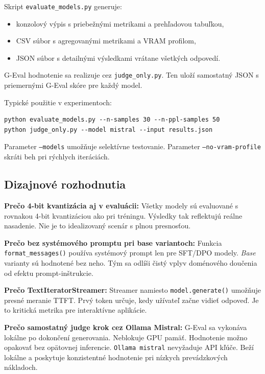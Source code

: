 Skript \texttt{evaluate\_models.py} generuje:
\begin{itemize}
    \item konzolový výpis s priebežnými metrikami a prehľadovou tabuľkou,
    \item CSV súbor s agregovanými metrikami a VRAM profilom,
    \item JSON súbor s detailnými výsledkami vrátane všetkých odpovedí.
\end{itemize}
 
G-Eval hodnotenie sa realizuje cez \texttt{judge\_only.py}. Ten uloží samostatný JSON s priemernými G-Eval skóre pre každý model.
 
Typické použitie v experimentoch:
\begin{verbatim}
python evaluate_models.py --n-samples 30 --n-ppl-samples 50
python judge_only.py --model mistral --input results.json
\end{verbatim}
 
Parameter \texttt{--models} umožňuje selektívne testovanie. Parameter \texttt{--no-vram-profile} skráti beh pri rýchlych iteráciách.
 
\subsection{Dizajnové rozhodnutia}
 
\textbf{Prečo 4-bit kvantizácia aj v evaluácii:}
Všetky modely sú evaluované s rovnakou 4-bit kvantizáciou ako pri tréningu. Výsledky tak reflektujú reálne nasadenie. Nie je to idealizovaný scenár s plnou presnosťou.
 
\textbf{Prečo bez systémového promptu pri base variantoch:}
Funkcia \texttt{format\_messages()} používa systémový prompt len pre SFT/DPO modely. \emph{Base} varianty sú hodnotené bez neho. Tým sa odlíši čistý vplyv doménového doučenia od efektu prompt-inštrukcie.
 
\textbf{Prečo TextIteratorStreamer:}
Streamer namiesto \texttt{model.generate()} umožňuje presné meranie TTFT. Prvý token určuje, kedy užívateľ začne vidieť odpoveď. Je to kritická metrika pre interaktívne aplikácie.
 
\textbf{Prečo samostatný judge krok cez Ollama Mistral:}
G-Eval sa vykonáva lokálne po dokončení generovania. Neblokuje GPU pamäť. Hodnotenie možno opakovať bez opätovnej inferencie. \texttt{Ollama mistral} nevyžaduje API kľúče. Beží lokálne a poskytuje konzistentné hodnotenie pri nízkych prevádzkových nákladoch.
